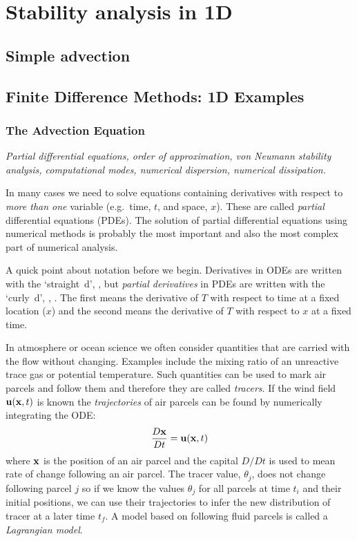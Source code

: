 
\appendix
\chapter{Stability analysis in 1D}

\section{Simple advection}


\section{Finite Difference Methods: 1D Examples}
\subsection{The Advection Equation}
\textsl{Partial differential equations, order of approximation, von
	Neumann stability analysis, computational modes, numerical
	dispersion, numerical dissipation.}

In many cases we need to solve equations containing
derivatives with respect to \emph{more than one} variable (e.g.~time,
$t$, and space, $x$).  These are called \emph{partial} differential
equations (PDEs). The solution of partial differential equations using
numerical methods is probably the most important and also the most
complex part of numerical analysis.

A quick point about notation before we begin.  Derivatives in ODEs are
written with the `straight~d',
\BEQ {}  \;\;\; , \EEQ
but {\em partial derivatives} in PDEs are written with the `curly~d',
\BEQ {} \;\;\; , \;\;\;  . \EEQ
The first means the derivative of $T$ with respect to time at a fixed
location ($x$) and the second means the derivative of $T$ with respect
to $x$ at a fixed time.

In atmosphere or ocean science we often consider quantities that are
carried with the flow without changing. Examples include the mixing
ratio of an unreactive trace gas or potential temperature. Such
quantities can be used to mark air parcels and follow them and
therefore they are called {\em tracers}. If the wind field ${\bf
	u}({\bf x}, t)$ is known the {\em trajectories} of air parcels can be
found by numerically integrating the ODE:
\begin{equation}
	\frac{D{\bf x}}{Dt}={\bf u}({\bf x}, t)
\end{equation}
where ${\bf x}$ is the position of an air parcel and the capital
$D/Dt$ is used to mean rate of change following an air parcel. 
The tracer value, $\theta_j$, does not change following parcel $j$ so
if we know the values $\theta_j$ for all parcels at time $t_i$ and
their initial positions, we can use their trajectories
to infer the new distribution of tracer at a later time $t_f$. A model
based on following fluid parcels is called a {\em Lagrangian model}.

